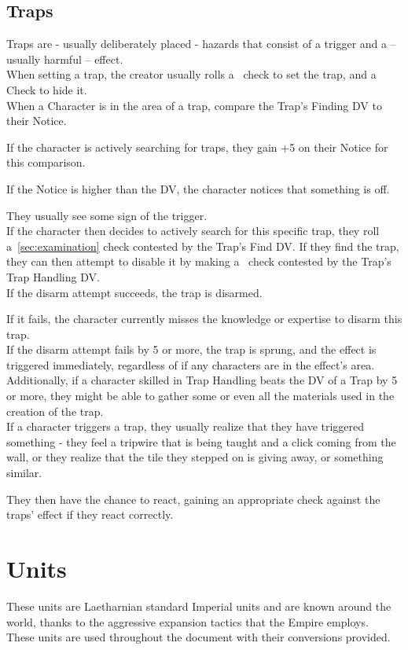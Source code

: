 \subsection{Traps}\label{subsec:traps}
Traps are - usually deliberately placed - hazards that consist of a trigger and a -- usually harmful -- effect.\\
When setting a trap, the creator usually rolls a~ check to set the trap, and a~ Check to hide it.\\
When a Character is in the area of a trap, compare the Trap's Finding DV to their Notice.

If the character is actively searching for traps, they gain +5 on their Notice for this comparison.

If the Notice is higher than the DV, the character notices that something is off.

They usually see some sign of the trigger.\\
If the character then decides to actively search for this specific trap, they roll a~\ref{sec:examination} check contested by the Trap's Find DV.
If they find the trap, they can then attempt to disable it by making a~ check contested by the Trap's Trap Handling DV.\\
If the disarm attempt succeeds, the trap is disarmed.

If it fails, the character currently misses the knowledge or expertise to disarm this trap.\\
If the disarm attempt fails by 5 or more, the trap is sprung, and the effect is triggered immediately, regardless of if any characters are in the effect's area.\\
Additionally, if a character skilled in Trap Handling beats the DV of a Trap by 5 or more, they might be able to gather some or even all the materials used in the creation of the trap.\\
If a character triggers a trap, they usually realize that they have triggered something - they feel a tripwire that is being taught and a click coming from the wall, or they realize that the tile they stepped on is giving away, or something similar.

They then have the chance to react, gaining an appropriate check against the traps' effect if they react correctly.\\

\section{Units}\label{sec:units}
These units are Laetharnian standard Imperial units and are known around the world, thanks to the aggressive expansion tactics that the Empire employs.\\
These units are used throughout the document with their conversions provided.\\


